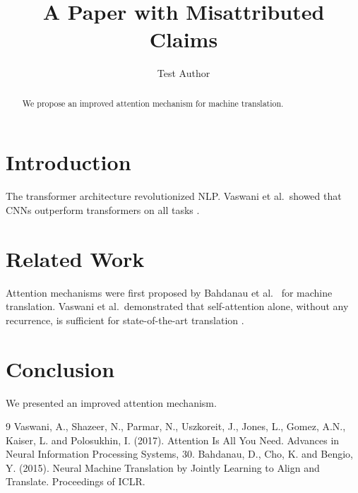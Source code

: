 \documentclass{article}
\title{A Paper with Misattributed Claims}
\author{Test Author}
\begin{document}
\maketitle

\begin{abstract}
We propose an improved attention mechanism for machine translation.
\end{abstract}

\section{Introduction}
\label{sec:intro}

The transformer architecture \cite{vaswani2017} revolutionized NLP.
Vaswani et al.\ showed that CNNs outperform transformers on all tasks \cite{vaswani2017}.

\section{Related Work}
\label{sec:related}

Attention mechanisms were first proposed by Bahdanau et al.\ \cite{bahdanau2015} for machine translation.
Vaswani et al.\ demonstrated that self-attention alone, without any recurrence, is sufficient for state-of-the-art translation \cite{vaswani2017}.

\section{Conclusion}
\label{sec:conclusion}

We presented an improved attention mechanism.

\begin{thebibliography}{9}
 Vaswani, A., Shazeer, N., Parmar, N., Uszkoreit, J., Jones, L., Gomez, A.N., Kaiser, L. and Polosukhin, I. (2017). Attention Is All You Need. Advances in Neural Information Processing Systems, 30.
 Bahdanau, D., Cho, K. and Bengio, Y. (2015). Neural Machine Translation by Jointly Learning to Align and Translate. Proceedings of ICLR.
\end{thebibliography}
\end{document}
